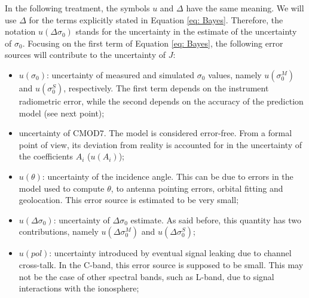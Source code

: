 In the following treatment, the symbols $u$ and $\Delta$ have the same
meaning. We will use $\Delta$ for the terms explicitly stated in Equation \ref{eq: Bayes}. Therefore, the notation $u(\Delta \sigma_{0})$ stands for the uncertainty in the estimate of the uncertainty of $\sigma_{0}$.
Focusing on the first term of Equation \ref{eq: Bayes}, the following error
sources will contribute to the uncertainty of $J$:
\begin{itemize}
	\item $u(\sigma_{0})$: uncertainty of measured and simulated $\sigma_{0}$ values, namely $u(\sigma_{0}^{M})$ and $u(\sigma_{0}^{S})$, respectively. The first term depends on the instrument radiometric error, while the second depends on the accuracy of the prediction model (see next point);
	\item uncertainty of $\mathrm{CMOD7}$. The model is considered error-free. From a formal point of view, its deviation from reality is accounted for in the uncertainty of the coefficients $A_{i}$ ($u(A_{i})$);
	\item $u(\theta)$: uncertainty of the incidence angle. This can be due to errors in the model used to compute $\theta$, to antenna pointing errors, orbital fitting and geolocation. This error source is estimated to be very small;
	\item $u(\Delta \sigma_{0})$: uncertainty of $\Delta \sigma_{0}$ estimate. As said before, this quantity has two contributions, namely $u(\Delta \sigma_{0}^{M})$ and $u(\Delta \sigma_{0}^{S})$;
	\item $u(pol)$: uncertainty introduced by eventual signal leaking due to channel cross-talk. In the C-band, this error source is supposed to be small. This may not be the case of other spectral bands, such as L-band, due to signal interactions with the ionosphere; 
\end{itemize} 

